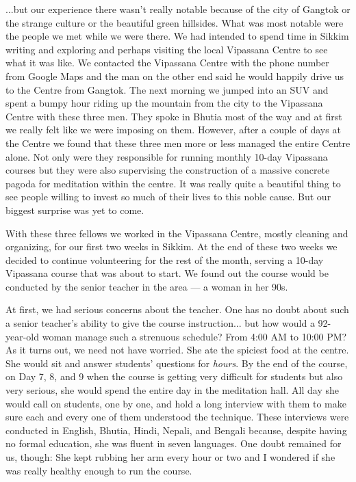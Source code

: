 \documentclass{article}
\begin{document}
...but our experience there wasn't really notable because of the city of Gangtok or
the strange culture or the beautiful green hillsides. What was most notable were the
people we met while we were there. We had intended to spend time in Sikkim writing
and exploring and perhaps visiting the local Vipassana Centre to see what it was
like. We contacted the Vipassana Centre with the phone number from Google Maps and
the man on the other end said he would happily drive us to the Centre from
Gangtok. The next morning we jumped into an SUV and spent a bumpy hour riding up the
mountain from the city to the Vipassana Centre with these three men. They spoke in
Bhutia most of the way and at first we really felt like we were imposing on
them. However, after a couple of days at the Centre we found that these three men
more or less managed the entire Centre alone. Not only were they responsible for
running monthly 10-day Vipassana courses but they were also supervising the
construction of a massive concrete pagoda for meditation within the centre. It was
really quite a beautiful thing to see people willing to invest so much of their lives
to this noble cause. But our biggest surprise was yet to come.

With these three fellows we worked in the Vipassana Centre, mostly cleaning and
organizing, for our first two weeks in Sikkim. At the end of these two weeks we
decided to continue volunteering for the rest of the month, serving a 10-day
Vipassana course that was about to start. We found out the course would be conducted
by the senior teacher in the area --- a woman in her 90s.

At first, we had serious concerns about the teacher. One has no doubt about such a
senior teacher's ability to give the course instruction... but how would a
92-year-old woman manage such a strenuous schedule? From 4:00 AM to 10:00 PM? As it
turns out, we need not have worried. She ate the spiciest food at the centre. She
would sit and answer students' questions for \textit{hours}. By the end of the
course, on Day 7, 8, and 9 when the course is getting very difficult for students but
also very serious, she would spend the entire day in the meditation hall. All day she
would call on students, one by one, and hold a long interview with them to make sure
each and every one of them understood the technique. These interviews were conducted
in English, Bhutia, Hindi, Nepali, and Bengali because, despite having no formal education,
she was fluent in seven languages. One doubt remained for us, though: She kept
rubbing her arm every hour or two and I wondered if she was really healthy enough to
run the course.
\end{document}
